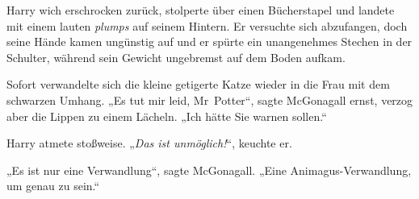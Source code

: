 Harry wich erschrocken zurück, stolperte über einen Bücherstapel und landete mit einem lauten \emph{plumps} auf seinem Hintern. Er versuchte sich abzufangen, doch seine Hände kamen ungünstig auf und er spürte ein unangenehmes Stechen in der Schulter, während sein Gewicht ungebremst auf dem Boden aufkam.

Sofort verwandelte sich die kleine getigerte Katze wieder in die Frau mit dem schwarzen Umhang.
„Es tut mir leid, Mr~Potter“, sagte McGonagall ernst, verzog aber die Lippen zu einem Lächeln.
„Ich hätte Sie warnen sollen.“

Harry atmete stoßweise.
„\emph{Das ist \emph{unmöglich}!}“, keuchte er.

„Es ist nur eine Verwandlung“, sagte McGonagall.
„Eine Animagus-Verwandlung, um genau zu sein.“

